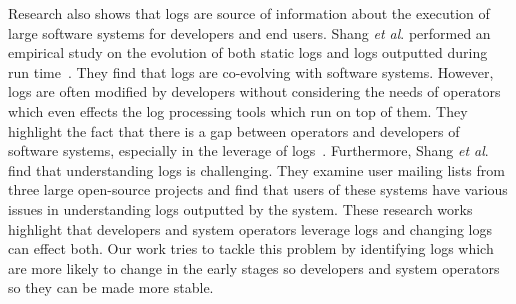 Research also shows that logs are source of information about the execution of large software systems for developers and end users. Shang \textsl{et al$ . $} performed an empirical study on the evolution of both static logs and logs outputted during run time~\cite{EMSEIAN,PaperIanCIIII}. They find that logs are co-evolving with software systems. However, logs are often modified by developers without considering the needs of operators which even effects the log processing tools which run on top of them. They highlight the fact that there is a gap between operators and developers of software systems, especially in the leverage of logs~\cite{IanGap}. Furthermore, Shang\textsl{ et al$ . $}~\cite{IanIcesm} find that understanding logs is challenging. They examine user mailing lists from three large open-source projects and find that users of these systems have various issues in understanding logs outputted by the system. These research works highlight that developers and system operators leverage logs and changing logs can effect both. Our work tries to tackle this problem by identifying logs which are more likely to change in the early stages so developers and system operators so they can be made more stable.  
